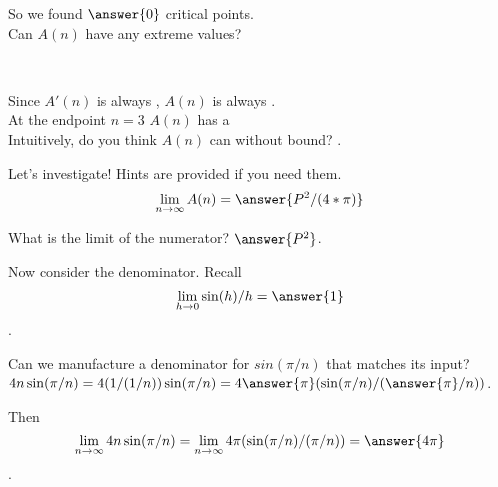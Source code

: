 \documentclass[handout,nooutcomes]{ximera}
\begin{document}
\bigskip

So we found $\answer{0}$ critical points.\\
Can $A(n)$ have any extreme values?\\
\begin{multipleChoice}
\end{multipleChoice}\\

\bigskip

Since $A'(n)$ is always , $A(n)$ is always .\\
At the endpoint $n=3$ $A(n)$ has a \\
Intuitively, do you think $A(n)$ can  without bound? .\\ %

\medskip

\begin{exercise}
Let's investigate! Hints are provided if you need them.\\
\[\lim_{n \to \infty}A(n) = \answer{P^2/(4*\pi)}\]
\begin{hint}
	What is the limit of the numerator? $\answer{P^2}$.
\end{hint}
\begin{hint}
  Now consider the denominator. Recall \[\lim_{h \to 0} \sin(h)/h = \answer{1}\].
\end{hint}
\begin{hint}
  Can we manufacture a denominator for $sin(\pi/n)$ that matches its input?\\
  $4n\sin(\pi/n) = 4(1/(1/n))\sin(\pi/n) = 4\answer{\pi}(\sin(\pi/n)/(\answer{\pi}/n))$.
\end{hint}
\begin{hint}
  Then \[\lim_{n \to \infty} 4n\sin(\pi/n) = \lim_{n \to \infty} 4\pi(\sin(\pi/n)/(\pi/n)) = \answer{4\pi}\].
\end{hint}
\end{exercise}
\end{document}
